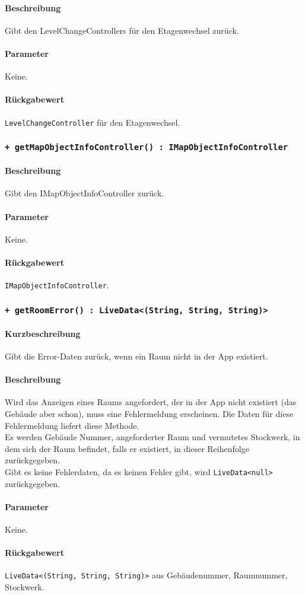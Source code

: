 \paragraph*{Beschreibung}
Gibt den LevelChangeControllers für den Etagenwechsel zurück.
\paragraph*{Parameter}
Keine.
\paragraph*{Rückgabewert}
\texttt{LevelChangeController} für den Etagenwechsel.

\subsubsection*{\texttt{+ getMapObjectInfoController() : IMapObjectInfoController}}\label{App_Map_ViewModel_getMapObjectInfoController}%
\paragraph*{Beschreibung}
Gibt den IMapObjectInfoController zurück.
\paragraph*{Parameter}
Keine.
\paragraph*{Rückgabewert}
\texttt{IMapObjectInfoController}.

\subsubsection*{\texttt{+ getRoomError() : LiveData<(String, String, String)>}}\label{App_Map_ViewModel_getRoomError}%
\paragraph*{Kurzbeschreibung}
Gibt die Error-Daten zurück, wenn ein Raum nicht in der App existiert.
\paragraph*{Beschreibung}
Wird das Anzeigen eines Raums angefordert, der in der App nicht existiert (das Gebäude aber schon), 
muss eine Fehlermeldung erscheinen. Die Daten für diese Fehlermeldung liefert diese Methode.\\
Es werden Gebäude Nummer, angeforderter Raum und vermutetes Stockwerk, in dem sich der Raum befindet, 
falls er existiert, in dieser Reihenfolge zurückgegeben.\\
Gibt es keine Fehlerdaten, da es keinen Fehler gibt, wird \texttt{LiveData<null>} zurückgegeben.
\paragraph*{Parameter}
Keine.
\paragraph*{Rückgabewert}
\texttt{LiveData<(String, String, String)>} aus Gebäudenummer, Raumnummer, Stockwerk.
